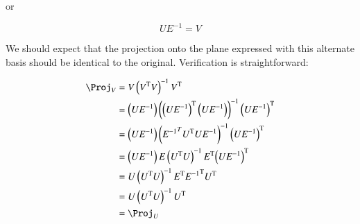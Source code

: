 \documentclass{article}      %
\newcommand{\T}[0]{{\text{T}}}
\begin{document}
or

\[
U E^{-1} = V
\]

We should expect that the projection onto the plane expressed with this alternate basis should be identical to the original.  Verification
is straightforward:

\begin{align*}
\Proj_V 
&= V \left(V^\T V\right)^{-1} V^\T \\
&= \left(U E^{-1}\right) \left({\left(U E^{-1}\right)}^\T \left(U E^{-1}\right)\right)^{-1} {\left(U E^{-1}\right)}^\T \\
&= \left(U E^{-1}\right) \left( {E^{-1}}^T U^\T U E^{-1}\right)^{-1} {\left(U E^{-1}\right)}^\T \\
&= \left(U E^{-1}\right) E \left( U^\T U\right)^{-1} E^\T {\left(U E^{-1}\right)}^\T \\
&= U \left( U^\T U\right)^{-1} E^\T {E^{-1}}^\T U^\T \\
&= U \left( U^\T U\right)^{-1} U^\T \\
&= \Proj_U
\end{align*}
\end{document}
